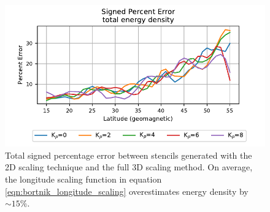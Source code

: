 \begin{figure}[h!]
\begin{center}
\includegraphics{figures/longitude_scaling_total_error.pdf}
\caption[Total percent error in 2D scaling]{Total signed percentage error between stencils generated with the 2D scaling technique and the full 3D scaling method. On average, the longitude scaling function in equation \eqref{eqn:bortnik_longitude_scaling} overestimates energy density by $\sim 15\%$.}
\label{fig:longitude_scaling_total}
\end{center}
\end{figure}













